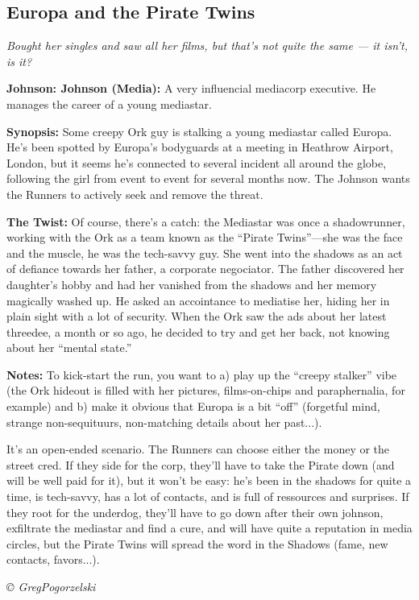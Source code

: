 \documentclass[letterpaper,onecolumn,10pt]{article}
\renewcommand{\textsc}[1]{{\fontspec{Friz Quadrata SC TT}\selectfont #1}}
\newcommand{\getyear}[1]{\StrLeft{#1}{4}}
\newenvironment{scenario}[6]
	{
		\section[#1 {\small\textsc{[#2]}}]{#1} \nopagebreak

		\noindent{\textsc{#2}}\nopagebreak

		\noindent\textit{#3}\nopagebreak
		\def\TMPSCENARIO{{\small\textit{©\getyear{#5}{} #4}}}
	}
	{\TMPSCENARIO}
\newcommand{\sectionlabel}[1]{\textbf{#1: }}
\newcommand{\johnson}[2]{\sectionlabel{Johnson: #1 (#2)}}
\newcommand{\synopsis}{\sectionlabel{Synopsis}}
\newcommand{\notes}{\sectionlabel{Notes}}
\newcommand{\twist}{\sectionlabel{The Twist}}
\begin{document}
\begin{multicols}{2}
\begin{scenario}{Europa and the Pirate Twins}
	{Investigation; Social}
	{Bought her singles and saw all her films, but that's not quite the same --- it isn't, is it?}
	{GregPogorzelski}
	{2007-04-16}
	{https://forum.rpg.net/showthread.php?321504-Shadowrun-4th-101-Instant-Scenarios\&p=7177053#post7177053}

\johnson{Johnson}{Media}  
A very influencial mediacorp executive. He manages the career of a young mediastar.

\synopsis Some creepy Ork guy is stalking a young mediastar called Europa. He's been spotted by Europa's bodyguards at a meeting in Heathrow Airport, London, but it seems he's connected to several incident all around the globe, following the girl from event to event for several months now. The Johnson wants the Runners to actively seek and remove the threat.

\twist Of course, there's a catch: the Mediastar was once a shadowrunner, working with the Ork as a team known as the ``Pirate Twins''---she was the face and the muscle, he was the tech-savvy guy. She went into the shadows as an act of defiance towards her father, a corporate negociator. The father discovered her daughter's hobby and had her vanished from the shadows and her memory magically washed up. He asked an accointance to mediatise her, hiding her in plain sight with a lot of security. When the Ork saw the ads about her latest threedee, a month or so ago, he decided to try and get her back, not knowing about her ``mental state.''

\notes To kick-start the run, you want to a) play up the ``creepy stalker'' vibe (the Ork hideout is filled with her pictures, films-on-chips and paraphernalia, for example) and b) make it obvious that Europa is a bit ``off'' (forgetful mind, strange non-sequituurs, non-matching details about her past...).

It's an open-ended scenario. The Runners can choose either the money or the street cred. If they side for the corp, they'll have to take the Pirate down (and will be well paid for it), but it won't be easy: he's been in the shadows for quite a time, is tech-savvy, has a lot of contacts, and is full of ressources and surprises. If they root for the underdog, they'll have to go down after their own johnson, exfiltrate the mediastar and find a cure, and will have quite a reputation in media circles, but the Pirate Twins will spread the word in the Shadows (fame, new contacts, favors...). 


\end{scenario}
\end{multicols}
\end{document}
